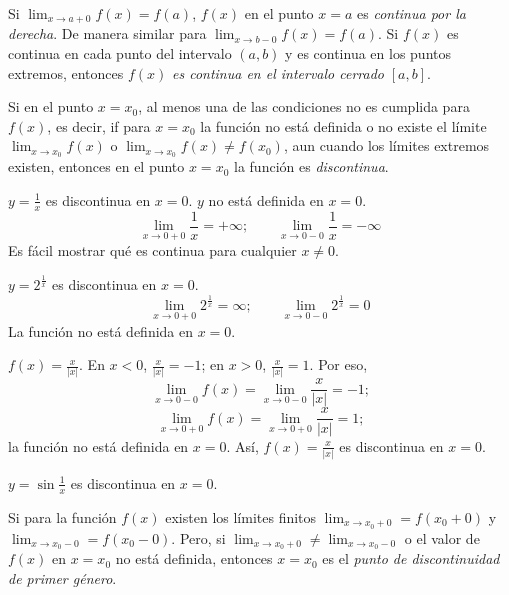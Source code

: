 Si \( \lim_{x \to a + 0} f(x) = f(a) \), \( f(x) \) en el punto \( x = a \) es \emph{continua por la derecha}. De manera similar para \( \lim_{x \to b - 0} f(x) = f(a) \).
Si \( f(x) \) es continua en cada punto del intervalo \( (a, b) \) y es continua en los puntos extremos, entonces \( f(x) \) \emph{es continua en el intervalo cerrado} \( [a, b] \).

Si en el punto \( x = x_0 \), al menos una de las condiciones no es cumplida para \( f(x) \), es decir, if para \( x = x_0 \) la función no está definida o no existe el límite \( \lim_{x \to x_0} f(x) \) o \( \lim_{x \to x_0} f(x) \ne f(x_0) \), aun cuando los límites extremos existen, entonces en el punto \( x = x_0 \) la función es \emph{discontinua}.


\begin{example}
  \( y = \frac{1}{x} \) es discontinua en \( x = 0 \). \( y \) no está definida en \( x = 0 \).
  \[
  \lim_{x \to 0+0} \frac{1}{x} = +\infty; \qquad
  \lim_{x \to 0-0} \frac{1}{x} = -\infty
  \]
  Es fácil mostrar qué es continua para cualquier \( x \ne 0 \).
\end{example}


\begin{example}
  \( y = 2^{\frac{1}{x}} \) es discontinua en \( x = 0 \).
  \[
  \lim_{x \to 0+0} 2^{\frac{1}{x}} = \infty; \qquad
  \lim_{x \to 0-0} 2^{\frac{1}{x}} = 0
  \]
  La función no está definida en \( x = 0 \).
\end{example}




\begin{example} \label{ex:discont}
  \( f(x) = \frac {x} {|x|} \). En \( x < 0 \), \( \frac{x}{|x|} = -1 \); en \( x > 0 \), \( \frac{x}{|x|} = 1 \). Por eso,
  \[
  \lim_{x \to 0-0} f(x) = \lim_{x \to 0-0} \frac{x}{|x|} = -1 \text{;}
  \]
  \[
  \lim_{x \to 0+0} f(x) = \lim_{x \to 0+0} \frac{x}{|x|} = 1 \text{;}
  \]
  la  función no está definida en \( x = 0 \). Así, \( f(x) = \frac{x}{|x|} \) es discontinua en \( x = 0 \).
\end{example}


\begin{example}
  \( y = \sin \frac{1}{x} \) es discontinua en \( x = 0 \).
\end{example}


\begin{definition}
  Si para la función \( f(x) \) existen los límites finitos \( \lim_{x \to x_0+0} = f(x_0 + 0) \) y \( \lim_{x \to x_0-0} = f(x_0 - 0) \). Pero, si \( \lim_{x \to x_0+0} \ne \lim_{x \to x_0-0} \) o el valor de \( f(x) \) en \( x = x_0 \) no está definida, entonces \( x = x_0 \) es el \emph{punto de discontinuidad de primer género}.
\end{definition}

